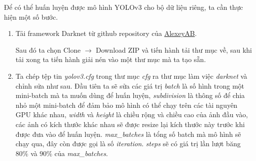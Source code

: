 Để có thể huấn luyện được mô hình YOLOv3 cho bộ dữ liệu riêng, ta cần thực hiện một số bước.
\begin{enumerate}
	\item Tải framework Darknet từ github repository của \href{https://github.com/AlexeyAB/darknet}{AlexeyAB}.
	
\noindent{}

	Sau đó ta chọn Clone $\rightarrow$ Download ZIP và tiến hành tải thư mục về, sau khi tải xong ta tiến hành giải nén vào một thư mục mà ta tạo sẵn.
	\item Ta chép tệp tin \emph{yolov3.cfg} trong thư mục \emph{cfg} ra thư mục làm việc \emph{darknet} và chỉnh sửa như sau. Đầu tiên ta sẽ sửa các giá trị \emph{batch} là số hình trong một mini-batch mà ta muốn dùng để huấn luyện, \emph{subdivision} là thông số để chia nhỏ một mini-batch để đảm bảo mô hình có thể chạy trên các tài nguyên GPU khác nhau, \emph{width} và \emph{height} là chiều rộng và chiều cao của ảnh đầu vào, các ảnh có kích thước khác nhau sẽ được resize lại kích thước này trước khi được đưa vào để huấn luyện. \emph{max{\_}batches} là tổng số batch mà mô hình sẽ chạy qua, đây còn được gọi là số \emph{iteration}. \emph{steps} sẽ có giá trị lần lượt băng $80\%$ và $90\%$ của \emph{max{\_}batches}.

\noindent{}


\end{enumerate}

